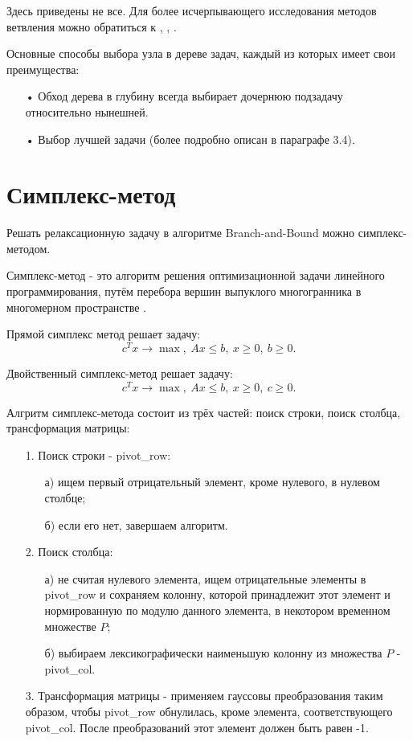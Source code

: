 \documentclass[a4paper,14pt,russian]{extreport}
\begin{document}
\par Здесь приведены не все. Для более исчерпывающего исследования методов ветвления можно обратиться к \cite{land_powell}, \cite{linderoth}, \cite{fuegenschuh}.
\par Основные способы выбора узла в дереве задач, каждый из которых имеет свои преимущества:
  \begin{itemize}
  \item[•] Обход дерева в глубину \cite{dakin} всегда выбирает дочернюю подзадачу относительно нынешней.
  \item[•] Выбор лучшей задачи (более подробно описан в параграфе 3.4).
  \end{itemize}


\section{Симплекс-метод}

Решать релаксационную задачу в алгоритме Branch-and-Bound можно симплекс-методом.
\par Симплекс-метод - это алгоритм решения оптимизационной задачи линейного программирования, путём перебора вершин выпуклого многогранника в многомерном пространстве \cite{dantzig}. 
\par Прямой симплекс метод решает задачу:
  $$c^Tx \rightarrow \max,~ Ax \le b,~ x \ge 0,~ b \ge 0.$$
\par Двойственный симплекс-метод решает задачу:
  $$c^Tx \rightarrow \max,~ Ax \le b,~ x \ge 0,~ c \ge 0.$$
\par Алгритм симплекс-метода состоит из трёх частей: поиск строки, поиск столбца, трансформация матрицы:
  \begin{enumerate}
  \item[1.] Поиск строки - pivot\_row:
    \begin{enumerate}
    \item[а)] ищем первый отрицательный элемент, кроме нулевого, в нулевом столбце;
    \item[б)] если его нет, завершаем алгоритм.
    \end{enumerate}
  \item[2.] Поиск столбца:
    \begin{enumerate}
    \item[а)] не считая нулевого элемента, ищем отрицательные элементы в pivot\_row и сохраняем колонну, которой принадлежит этот элемент и нормированную по модулю данного элемента, в некотором временном множестве $P$;
    \item[б)] выбираем лексикографически наименьшую колонну из множества $P$ - pivot\_col.
    \end{enumerate}
  \item[3.] Трансформация матрицы - применяем гауссовы преобразования таким образом, чтобы pivot\_row обнулилась, кроме элемента, соответствующего pivot\_col. После преобразований этот элемент должен быть равен -1.
  \end{enumerate}
\end{document}
